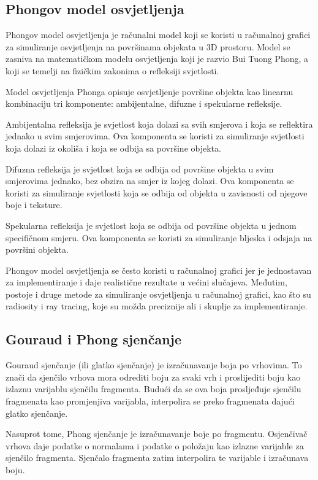 \documentclass[a4paper,12pt]{article}
\begin{document}
\newpage
\subsection{Phongov model osvjetljenja}
Phongov model osvjetljenja je računalni model koji se koristi u računalnoj grafici za simuliranje osvjetljenja na površinama objekata u 3D prostoru. Model se zasniva na matematičkom modelu osvjetljenja koji je razvio Bui Tuong Phong, a koji se temelji na fizičkim zakonima o refleksiji svjetlosti.

Model osvjetljenja Phonga opisuje osvjetljenje površine objekta kao linearnu kombinaciju tri komponente: ambijentalne, difuzne i spekularne refleksije.

Ambijentalna refleksija je svjetlost koja dolazi sa svih smjerova i koja se reflektira jednako u svim smjerovima. Ova komponenta se koristi za simuliranje svjetlosti koja dolazi iz okoliša i koja se odbija sa površine objekta.

Difuzna refleksija je svjetlost koja se odbija od površine objekta u svim smjerovima jednako, bez obzira na smjer iz kojeg dolazi. Ova komponenta se koristi za simuliranje svjetlosti koja se odbija od objekta u zavisnosti od njegove boje i teksture.

Spekularna refleksija je svjetlost koja se odbija od površine objekta u jednom specifičnom smjeru. Ova komponenta se koristi za simuliranje bljeska i odsjaja na površini objekta.

Phongov model osvjetljenja se često koristi u računalnoj grafici jer je jednostavan za implementiranje i daje realistične rezultate u većini slučajeva. Međutim, postoje i druge metode za simuliranje osvjetljenja u računalnoj grafici, kao što su radiosity i ray tracing, koje su možda preciznije ali i skuplje za implementiranje.
\subsection{Gouraud i Phong sjenčanje}

Gouraud sjenčanje (ili glatko sjenčanje) je izračunavanje boja po vrhovima. 
To znači da sjenčilo vrhova mora odrediti boju za svaki vrh i proslijediti boju kao izlaznu varijablu sjenčilu fragmenta. 
Budući da se ova boja prosljeđuje sjenčilu fragmenata kao promjenjiva varijabla, interpolira se preko fragmenata dajući glatko sjenčanje.

Nasuprot tome, Phong sjenčanje je izračunavanje boje po fragmentu. 
Osjenčivač vrhova daje podatke o normalama i podatke o položaju kao izlazne varijable za sjenčilo fragmenta. 
Sjenčalo fragmenta zatim interpolira te varijable i izračunava boju.
\end{document}
